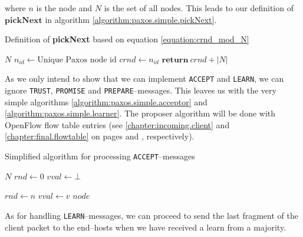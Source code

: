 where $n$ is the node and $N$ is the set of all nodes.  This leads to our
definition of $\textbf{pickNext}$ in algorithm
\ref{algorithm:paxos.simple.pickNext}.

\begin{algorithm}
  \caption{Definition of \textbf{pickNext} based on equation \ref{equation:crnd_mod_N}}
  \label{algorithm:paxos.simple.pickNext}
  \begin{algorithmic}
    \State $N$ 
    \State $n_{id} \gets \text{Unique Paxos node id}$
    \State $crnd \gets n_{id}$ 
    \State
      \State $\textbf{return}\ crnd + |N|$ 
    \EndFunction
  \end{algorithmic}
\end{algorithm}

As we only intend to show that we can implement \texttt{ACCEPT} and
\texttt{LEARN}, we can ignore \texttt{TRUST}, \texttt{PROMISE} and
\texttt{PREPARE}--messages.  This leaves us with the very simple algorithms
\ref{algorithm:paxos.simple.acceptor} and
\ref{algorithm:paxos.simple.learner}.  The proposer algorithm will be done
with OpenFlow flow table entries (see \ref{chapter:incoming.client}
    and \ref{chapter:final.flowtable} on pages
    \pageref{chapter:final.flowtable} and 
    \pageref{chapter:incoming.client}, respectively).

\begin{algorithm}
  \caption{Simplified algorithm for processing \texttt{ACCEPT}--messages}
  \label{algorithm:paxos.simple.acceptor}
  \begin{algorithmic}
    \State $N$
    \State $rnd \gets 0$ 
    \State $vval \gets \bot$ 
    \State

        \State $rnd\gets n$
        \State $vval\gets v$ 
           \State {}
                         {$node$}
        \EndForIn
      \EndIf
    \EndOn
  \end{algorithmic}
\end{algorithm}

As for handling \texttt{LEARN}--messages, we can proceed to send the last
fragment of the client packet to the end--hosts when we have received a
learn from a majority.

